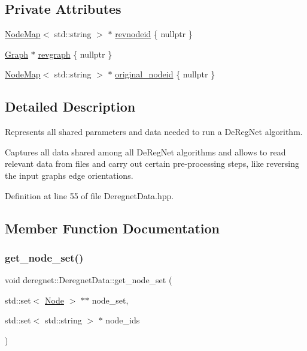 \subsection*{Private Attributes}
\begin{DoxyCompactItemize}
\item 
\hyperlink{namespacederegnet_ae102b707ae1d6f83c639ece5e0dd5658}{Node\+Map}$<$ std\+::string $>$ $\ast$ \hyperlink{classderegnet_1_1DeregnetData_ad15bd1f0e5ab9d01b82b5c696203b855}{revnodeid} \{ nullptr \}
\item 
\hyperlink{namespacederegnet_a55b76c55bbabc682cbc61f8b9948799e}{Graph} $\ast$ \hyperlink{classderegnet_1_1DeregnetData_a4b6a17e13aeda78317ff37567e7fd26d}{revgraph} \{ nullptr \}
\item 
\hyperlink{namespacederegnet_ae102b707ae1d6f83c639ece5e0dd5658}{Node\+Map}$<$ std\+::string $>$ $\ast$ \hyperlink{classderegnet_1_1DeregnetData_a6707f9bbc1ac5ccf78724e73cd8053b1}{original\+\_\+nodeid} \{ nullptr \}
\end{DoxyCompactItemize}


\subsection{Detailed Description}
Represents all shared parameters and data needed to run a De\+Reg\+Net algorithm. 

Captures all data shared among all De\+Reg\+Net algorithms and allows to read relevant data from files and carry out certain pre-\/processing steps, like reversing the input graph\textquotesingle{}s edge orientations. 

Definition at line 55 of file Deregnet\+Data.\+hpp.



\subsection{Member Function Documentation}
\mbox{\label{classderegnet_1_1DeregnetData_a7d662c0dd84d814bbaaf56718a99306a}} 
\subsubsection{\texorpdfstring{get\+\_\+node\+\_\+set()}{get\_node\_set()}}
{\footnotesize\ttfamily void deregnet\+::\+Deregnet\+Data\+::get\+\_\+node\+\_\+set (\begin{DoxyParamCaption}\item[{std\+::set$<$ \hyperlink{namespacederegnet_a744bad34f2de9856d36715a445f027f3}{Node} $>$ $\ast$$\ast$}]{node\+\_\+set,  }\item[{std\+::set$<$ std\+::string $>$ $\ast$}]{node\+\_\+ids }\end{DoxyParamCaption})}



